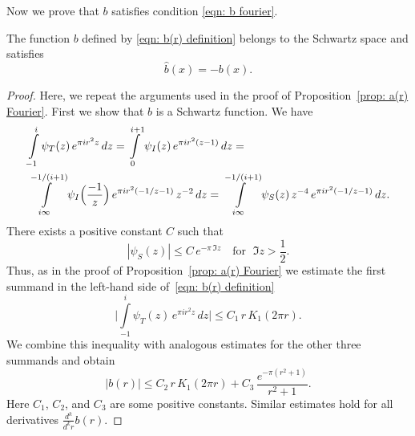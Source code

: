 Now we prove that $b$ satisfies condition \eqref{eqn: b fourier}.
\begin{proposition}\label{prop: b(r) Fourier}
The function $b$ defined by \eqref{eqn: b(r) definition} belongs to the Schwartz space and satisfies
  $$\widehat{b}(x)=-b(x). $$
\end{proposition}
\begin{proof}
Here, we repeat the arguments used in the proof of Proposition~\ref{prop: a(r) Fourier}. First we show that $b$ is a Schwartz function. We have
\begin{align}
  &\int\limits_{-1}^{i}\psi_T(z)\,e^{\pi i r^2 z}\,dz=\int\limits_{0}^{i+1}\psi_I(z)\,e^{\pi i r^2 (z-1)}\,dz=\notag\\
  &\int\limits_{i\infty}^{-1/(i+1)}\psi_I\Big(\frac{-1}{z}\Big)\,e^{\pi i r^2 (-1/z-1)}\,z^{-2}\,dz=\int\limits_{i\infty}^{-1/(i+1)}\psi_S(z)\,z^{-4}\,e^{\pi i r^2 (-1/z-1)}\,dz.\notag
\end{align}
There exists a positive constant $C$ such that
$$|\psi_S(z)|\leq C\,e^{-\pi\,\Im{z}}\quad\mbox{for }\;\Im{z}>\frac12.$$
Thus, as in the proof of Proposition~\ref{prop: a(r) Fourier} we estimate the first summand in the left-hand side of~\eqref{eqn: b(r) definition}
$$\Bigg|\int\limits_{-1}^i \psi_T(z)\,e^{\pi i r^2 z}\,dz \Bigg|\leq C_1\,r\,K_1(2\pi r).$$
We combine this inequality with analogous estimates for the other three summands and obtain
$$|b(r)|\leq C_2\,r\,K_1(2\pi r)+C_3\,\frac{e^{-\pi(r^2+1)}}{r^2+1}.$$
Here $C_1$, $C_2$, and $C_3$ are some positive constants. Similar estimates hold for all derivatives $\frac{d^k}{d^k r} b(r)$.


\end{proof}
